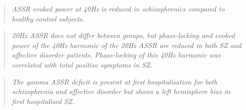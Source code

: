 \begin{quotation}
	\textit{ASSR evoked power at 40Hz is reduced in schizophrenics compared to healthy control subjects.}
	\begin{flushright}
		\cite{spencer2008gamma}
	\end{flushright}
\end{quotation}
\begin{quotation}
	\textit{20Hz ASSR does not differ between groups, but phase-locking and evoked power of the 40Hz harmonic of the 20Hz ASSR are reduced in both SZ and affective disorder patients. Phase-locking of this 40Hz harmonic was correlated with total positive symptoms in SZ.}
	\begin{flushright}
		\cite{spencer2008gamma}
	\end{flushright}
\end{quotation}
\begin{quotation}
	\textit{The gamma ASSR deficit is present at first hospitalisation for both schizophrenia and affective disorder but shows a left hemisphere bias in first hospitalised SZ.}
	\begin{flushright}
		\cite{spencer2008gamma}
	\end{flushright}
\end{quotation}